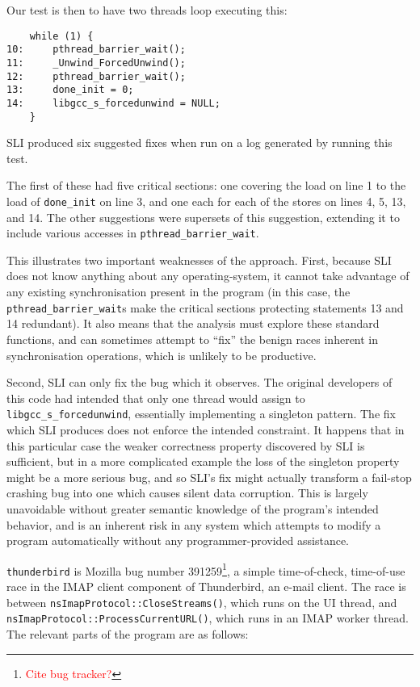 \documentclass[10pt,twocolumn,preprint,natbib,authoryear]{sigplanconf}
\newcommand{\editorial}[1]{\textcolor{red}{\footnote{\textcolor{red}{#1}}}}
\begin{document}
Our test is then to have two threads loop executing this:

\begin{verbatim}
    while (1) {
10:     pthread_barrier_wait();
11:     _Unwind_ForcedUnwind();
12:     pthread_barrier_wait();
13:     done_init = 0;
14:     libgcc_s_forcedunwind = NULL;
    }
\end{verbatim}

SLI produced six suggested fixes when run on a log generated by
running this test.

The first of these had five critical sections: one covering the load
on line 1 to the load of \verb|done_init| on line 3, and one each for
each of the stores on lines 4, 5, 13, and 14.  The other suggestions
were supersets of this suggestion, extending it to include various
accesses in \verb|pthread_barrier_wait|.

This illustrates two important weaknesses of the approach.  First,
because SLI does not know anything about any operating-system, it
cannot take advantage of any existing synchronisation present in the
program (in this case, the \verb|pthread_barrier_wait|s make the
critical sections protecting statements 13 and 14 redundant).  It also
means that the analysis must explore these standard functions, and can
sometimes attempt to ``fix'' the benign races inherent in
synchronisation operations, which is unlikely to be productive.

Second, SLI can only fix the bug which it observes.  The original
developers of this code had intended that only one thread would assign
to \verb|libgcc_s_forcedunwind|, essentially implementing a singleton
pattern.  The fix which SLI produces does not enforce the intended
constraint.  It happens that in this particular case the weaker
correctness property discovered by SLI is sufficient, but in a more
complicated example the loss of the singleton property might be a more
serious bug, and so SLI's fix might actually transform a fail-stop
crashing bug into one which causes silent data corruption.  This is
largely unavoidable without greater semantic knowledge of the
program's intended behavior, and is an inherent risk in any system
which attempts to modify a program automatically without any
programmer-provided assistance.

\verb|thunderbird| is Mozilla bug number 391259\editorial{Cite bug
  tracker?}, a simple time-of-check, time-of-use race in the IMAP
client component of Thunderbird, an e-mail client.  The race is
between \verb|nsImapProtocol::CloseStreams()|, which runs on the UI
thread, and \verb|nsImapProtocol::ProcessCurrentURL()|, which runs in
an IMAP worker thread.  The relevant parts of the program are as
follows:
\end{document}
